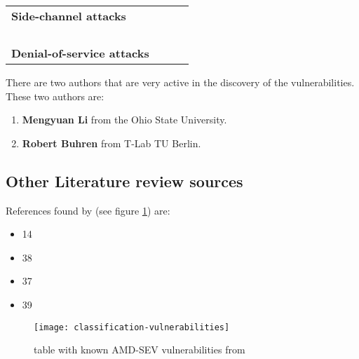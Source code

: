 \begin{table}[ht]
{\begin{tabular}{|p{3.5cm}|p{3.5cm}|p{3.5cm}|p{3.5cm}|}
    \textbf{Side-channel attacks} 
    & \begin{minipage}[t]{7cm}
        \cite{li_crossline_2021}\\ 
        \cite{li_cipherleaks_2021}\\ 
        \cite{mestas_exploitation_2021} 
      \end{minipage}
    & \begin{minipage}[t]{7cm}
        \cite{li_crossline_2021}\\
        \cite{li_cipherleaks_2021}\\
        \cite{mestas_exploitation_2021} 
      \end{minipage}
    & 
    \\

    \textbf{Denial-of-service attacks} 
    & 
    & 
    & 
    \\
    \hline

  \end{tabular}
}
\end{table}

There are two authors that are very active in the discovery of the vulnerabilities. 
These two authors are: 
\begin{enumerate}
  \item \textbf{Mengyuan Li} from the Ohio State University.  
  \item \textbf{Robert Buhren} from T-Lab TU  Berlin.
\end{enumerate}

\subsection{Other Literature review sources}

References found by \cite{leijonberg_viability_2021} 
(see figure \ref{fig:classification-vulnerabilities}) are:

\begin{itemize}
\item 14  \cite{buhren_insecure_2019}
\item 38  \cite{li_exploiting_2019}
\item 37  \cite{li_exploiting_2019}
\item 39  \cite{2019-werner}
\end{itemize}

\begin{figure}[!ht]
    \centering
    \texttt{[image: classification-vulnerabilities]}
    \caption{table with known AMD-SEV vulnerabilities  
    from \cite{leijonberg_viability_2021}}
    \label{fig:classification-vulnerabilities}
\end{figure}


